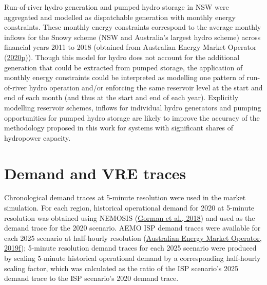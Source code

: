 \documentclass[12pt,a4paper,]{report}
\begin{document}
Run-of-river hydro generation and pumped hydro storage in NSW were
aggregated and modelled as dispatchable generation with monthly energy
constraints. These monthly energy constraints correspond to the average
monthly inflows for the Snowy scheme (NSW and Australia's largest hydro
scheme) across financial years 2011 to 2018 (obtained from Australian
Energy Market Operator
(\protect\hyperlink{ref-australianenergymarketoperator2020InputsAssumptions2020}{2020p})).
Though this model for hydro does not account for the additional
generation that could be extracted from pumped storage, the application
of monthly energy constraints could be interpreted as modelling one
pattern of run-of-river hydro operation and/or enforcing the same
reservoir level at the start and end of each month (and thus at the
start and end of each year). Explicitly modelling reservoir schemes,
inflows for individual hydro generators and pumping opportunities for
pumped hydro storage are likely to improve the accuracy of the
methodology proposed in this work for systems with significant shares of
hydropower capacity.

\hypertarget{demand-and-vre-traces}{%
\section{Demand and VRE traces}\label{demand-and-vre-traces}}

Chronological demand traces at 5-minute resolution were used in the
market simulation. For each region, historical operational demand for
2020 at 5-minute resolution was obtained using NEMOSIS
(\protect\hyperlink{ref-gormanNEMOSISNEMOpen2018}{Gorman et al., 2018})
and used as the demand trace for the 2020 scenario. AEMO ISP demand
traces were available for each 2025 scenario at half-hourly resolution
(\protect\hyperlink{ref-australianenergymarketoperator2020DraftISP2019a}{Australian
Energy Market Operator, 2019f}); 5-minute resolution demand traces for
each 2025 scenario were produced by scaling 5-minute historical
operational demand by a corresponding half-hourly scaling factor, which
was calculated as the ratio of the ISP scenario's 2025 demand trace to
the ISP scenario's 2020 demand trace.
\end{document}

